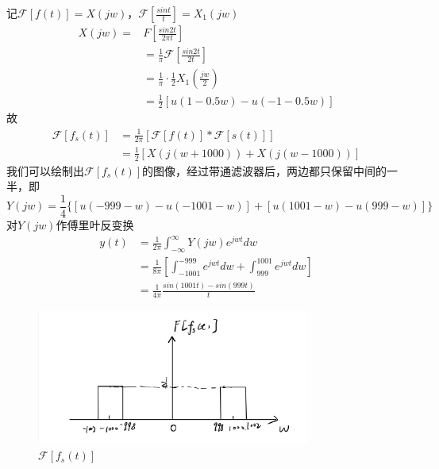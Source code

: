 \documentclass[answers]{exam}
\begin{document}
\begin{questions}
\begin{solution}
	记$\mathcal{F}[f(t)]=X(jw)$，$\mathcal{F}[\frac{sint}{t}]=X_1(jw)$
\begin{align*}
	X(jw)=&F[\frac{sin2t}{2\pi t}]\\
	&=\frac{1}{\pi}\mathcal{F}[\frac{sin2t}{2t}]\\
	&=\frac{1}{\pi}\cdot\frac{1}{2}X_1(\frac{jw}{2})\\
	&=\frac{1}{2}[u(1-0.5w)-u(-1-0.5w)]
\end{align*}
故
\begin{align*}
	\mathcal{F}[f_s(t)]&=\frac{1}{2\pi}[\mathcal{F}[f(t)]*\mathcal{F}[s(t)]]\\
	&=\frac{1}{2}[X(j(w+1000))+X(j(w-1000))]
\end{align*}
我们可以绘制出$\mathcal{F}[f_s(t)]$的图像，经过带通滤波器后，两边都只保留中间的一半，即
$$Y(jw)=\frac{1}{4}\{[u(-999-w)-u(-1001-w)]+[u(1001-w)-u(999-w)]\}$$
对$Y(jw)$作傅里叶反变换\\
\begin{align*}
	y(t)&=\frac{1}{2\pi}\int_{-\infty}^{\infty}Y(jw)e^{jwt}dw\\
	&=\frac{1}{8\pi}[\int_{-1001}^{-999}e^{jwt}dw+\int_{999}^{1001}e^{jwt}dw]\\
	&=\frac{1}{4\pi}\frac{sin(1001t)-sin(999t)}{t}
\end{align*}
\end{solution}
\begin{figure}[h]
	\centering
	\includegraphics[width=0.8\textwidth]{pics/p1.png}
	\caption{$\mathcal{F}[f_s(t)]$}
\end{figure}


\end{questions}
\end{document}

